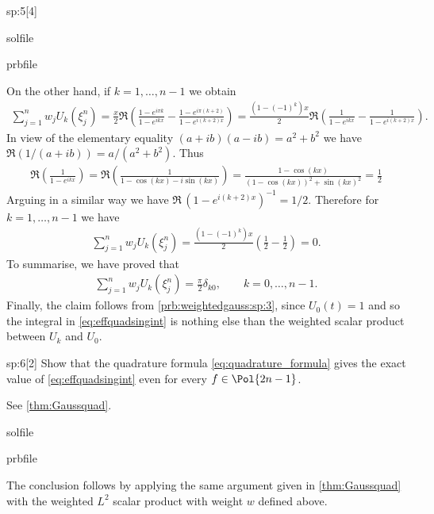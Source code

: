 \begin{samproblem}
\begin{subproblem}{sp:5}[4]
\begin{samwriteprbpart}{solfile}
\begin{writeverbatim}{prbfile}
\begin{samsolution}
        On the other hand, if $k=1,\dots,n-1$ we obtain
        \begin{align*}
          \sum_{j=1}^n w_j U_k(\xi^n_j) =  \frac{x}{2}\Re\left( \frac{1-e^{i\pi k}}{1-e^{i k x}}-
          \frac{1-e^{i\pi(k+2)}}{1-e^{i (k+2) x }}\right) =  \frac{(1-(-1)^k)x}{2}\Re\left( \frac{1}{1-e^{i k x}}-\frac{1}{1-e^{i (k+2) x}}\right).
        \end{align*}
        In view of the elementary equality $(a+ib)(a-ib)=a^2+b^2$ we have $\Re(1/(a+ib)) = a/(a^2+b^2)$. Thus
        \begin{align*}
          \Re\left( \frac{1}{1-e^{i k x}}\right) = \Re\left( \frac{1}{1-\cos(kx)-i\sin(kx)} \right)
          = \frac{1-\cos(kx)}{(1-\cos(kx))^2 + \sin(kx)^2}  = \frac{1}{2}
        \end{align*}
        Arguing in a similar way we have $\Re\,(1-e^{i (k+2) x})^{-1}= 1/2$. Therefore for $k=1,\dots,n-1$ we have
        \begin{align*}
          \sum_{j=1}^n w_j U_k(\xi^n_j) = \frac{(1-(-1)^k)x}{2}\left( \frac{1}{2} -\frac{1}{2} \right) = 0.
        \end{align*}
        To summarise, we have proved that
        \begin{align*}
          \sum_{j=1}^n w_j U_k(\xi^n_j) = \frac{\pi}{2}\delta_{k0},\qquad k=0,\dots,n-1.
        \end{align*}
        Finally, the claim follows from \ref{prb:weightedgauss:sp:3}, since $U_0(t)=1$ and so the integral in  \eqref{eq:effquadsingint} 
        is nothing else than the weighted scalar product between $U_k$ and $U_0$.     
      \end{samsolution}
    \end{writeverbatim}
  \end{samwriteprbpart}

\end{subproblem}

\begin{subproblem}{sp:6}[2]
  Show that the quadrature formula \eqref{eq:quadrature_formula} gives the exact value of \eqref{eq:effquadsingint}  even for every $f\in \Pol{2n-1}$.
  \begin{samhint}
    See \cref{thm:Gaussquad}.
  \end{samhint}
  \begin{samwriteprbpart}{solfile}
    \begin{writeverbatim}{prbfile}
      \begin{samsolution}
        The conclusion follows by applying the same argument given in \cref{thm:Gaussquad} with the weighted $L^2$ scalar 
        product with weight $w$ defined above.
     \end{samsolution}
    \end{writeverbatim}
  \end{samwriteprbpart}


\end{subproblem}
\end{samproblem}
